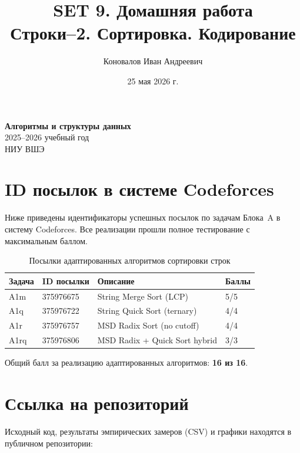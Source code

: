 \documentclass[12pt,a4paper]{article}
\title{\textbf{SET 9. Домашняя работа} \\ Строки--2. Сортировка. Кодирование}
\author{Коновалов Иван Андреевич}
\date{25 мая 2026 г.}
\begin{document}
\maketitle
\thispagestyle{empty}

\vspace{2cm}
\begin{center}
\textbf{Алгоритмы и структуры данных} \\
2025--2026 учебный год \\
НИУ ВШЭ
\end{center}

\newpage

\tableofcontents
\newpage


\section{ID посылок в системе Codeforces}

Ниже приведены идентификаторы успешных посылок по задачам Блока~A в систему Codeforces. Все реализации прошли полное тестирование с максимальным баллом.

\begin{table}[H]
\centering
\begin{tabular}{llll}
\toprule
\textbf{Задача} & \textbf{ID посылки} & \textbf{Описание} & \textbf{Баллы} \\
\midrule
A1m & 375976675 & String Merge Sort (LCP)      & 5/5 \\
A1q & 375976722 & String Quick Sort (ternary)   & 4/4 \\
A1r & 375976757 & MSD Radix Sort (no cutoff)    & 4/4 \\
A1rq & 375976806 & MSD Radix + Quick Sort hybrid & 3/3 \\
\bottomrule
\end{tabular}
\caption{Посылки адаптированных алгоритмов сортировки строк}
\end{table}

Общий балл за реализацию адаптированных алгоритмов: \textbf{16 из 16}.

\section{Ссылка на репозиторий}

Исходный код, результаты эмпирических замеров (CSV) и графики находятся в публичном репозитории:
\end{document}
